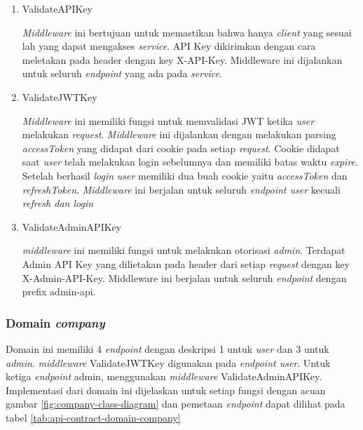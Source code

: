 \begin{enumerate}
  \item ValidateAPIKey

        \textit{Middleware} ini bertujuan untuk memastikan bahwa hanya \textit{client} yang sesuai lah yang dapat mengakses \textit{service}. API Key dikirimkan dengan cara meletakan pada header dengan key X-API-Key. Middleware ini dijalankan untuk seluruh \textit{endpoint} yang ada pada \textit{service}.

  \item ValidateJWTKey

        \textit{Middleware} ini memiliki fungsi untuk memvalidasi JWT ketika \textit{user} melakukan \textit{request}. \textit{Middleware} ini dijalankan dengan melakukan parsing \textit{accessToken} yang didapat dari cookie pada setiap \textit{request}. Cookie didapat saat \textit{user} telah melakukan login sebelumnya dan memiliki batas waktu \textit{expire}. Setelah berhasil \textit{login} \textit{user} memiliki dua buah cookie yaitu \textit{accessToken} dan \textit{refreshToken}.  \textit{Middleware} ini berjalan untuk seluruh \textit{endpoint user} kecuali \textit{refresh dan login}


  \item ValidateAdminAPIKey

        \textit{middleware} ini memiliki fungsi untuk melakukan otorisasi \textit{admin}. Terdapat Admin API Key yang dilietakan pada header dari setiap \textit{request} dengan key X-Admin-API-Key. Middleware ini berjalan untuk seluruh \textit{endpoint} dengan prefix admin-api.
\end{enumerate}


\subsubsection{Domain \textit{company}}

Domain ini memiliki 4 \textit{endpoint} dengan deskripsi 1 untuk \textit{user} dan 3 untuk \textit{admin}. \textit{middleware} ValidateJWTKey digunakan pada \textit{endpoint user}. Untuk ketiga \textit{endpoint} admin, menggunakan \textit{middleware} ValidateAdminAPIKey. Implementasi dari domain ini dijelaskan untuk setiap fungsi dengan acuan gambar \ref{fig:company-class-diagram} dan pemetaan \textit{endpoint} dapat dilihat pada tabel \ref{tab:api-contract-domain-company}


